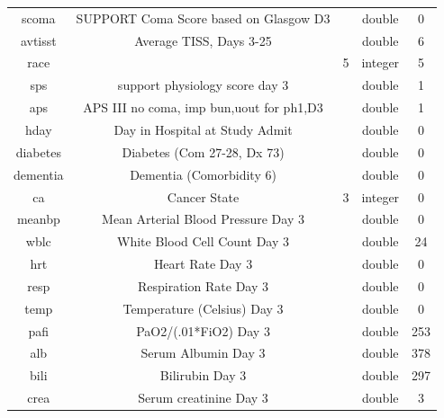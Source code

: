 \documentclass[
]{jss}
\begin{document}
\begin{table}[ht]
\begin{tabular}{ccccc}
scoma         & SUPPORT Coma Score based on Glasgow D3   &                 & double           & 0            \\
avtisst       & Average TISS, Days 3-25                  &                 & double           & 6            \\
race          &                                          & 5               & integer          & 5            \\
sps             & support physiology score day 3           &                   & double           & 1            \\
aps           & APS III no coma, imp bun,uout for ph1,D3 &                 & double           & 1            \\
hday            & Day in Hospital at Study Admit             &                 & double           & 0            \\ 
diabetes      & Diabetes (Com 27-28, Dx 73)              &                 & double           & 0            \\
dementia      & Dementia (Comorbidity 6)                 &                 & double           & 0            \\
ca              & Cancer State                             & 3               & integer          & 0            \\
meanbp        & Mean Arterial Blood Pressure Day 3       &                 & double           & 0            \\
wblc          & White Blood Cell Count Day 3             &                 & double           & 24           \\
hrt           & Heart Rate Day 3                         &                 & double           & 0            \\
resp          & Respiration Rate Day 3                   &                 & double           & 0            \\
temp          & Temperature (Celsius) Day 3              &                 & double           & 0            \\
pafi          & PaO2/(.01*FiO2) Day 3                    &                 & double           & 253          \\
alb           & Serum Albumin Day 3                      &                 & double           & 378          \\
bili          & Bilirubin Day 3                          &                 & double           & 297          \\
crea          & Serum creatinine Day 3                   &                 & double           & 3            \\

\end{tabular}
\end{table}
\end{document}
